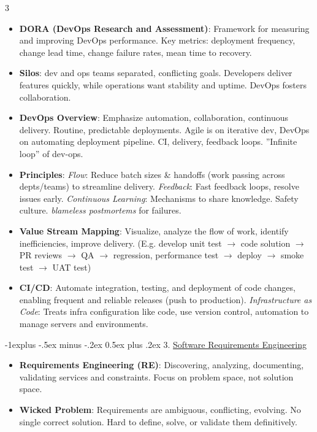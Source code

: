 \documentclass[a4paper, 10pt, landscape]{article}
\makeatletter
\renewcommand{\subsection}{\@startsection{subsection}{2}{0mm}%
                                {-1explus -.5ex minus -.2ex}%
                                {0.5ex plus .2ex}%
                                {\normalfont\normalsize\bfseries}}
\makeatother
\begin{document}
\begin{multicols*}{3}
\begin{itemize}
    \item \textbf{DORA (DevOps Research and Assessment)}: Framework for measuring and improving DevOps performance. Key metrics: deployment frequency, change lead time, change failure rates, mean time to recovery.
    \item \textbf{Silos}: dev and ops teams separated, conflicting goals. Developers deliver features quickly, while operations want stability and uptime. DevOps fosters collaboration.
    \item \textbf{DevOps Overview}: Emphasize automation, collaboration, continuous delivery. Routine, predictable deployments. Agile is on iterative dev, DevOps on automating deployment pipeline. CI, delivery, feedback loops. ''Infinite loop'' of dev-ops.
    \item \textbf{Principles}: \textit{Flow}: Reduce batch sizes \& handoffs (work passing across depts/teams) to streamline delivery. \textit{Feedback}: Fast feedback loops, resolve issues early. \textit{Continuous Learning}: Mechanisms to share knowledge. Safety culture. \textit{blameless postmortems} for failures.
       \item \textbf{Value Stream Mapping}: Visualize, analyze the flow of work, identify inefficiencies, improve delivery. (E.g. develop unit test $\rightarrow$ code solution $\rightarrow$ PR reviews $\rightarrow$ QA $\rightarrow$ regression, performance test $\rightarrow$ deploy $\rightarrow$ smoke test $\rightarrow$ UAT test)
    \item \textbf{CI/CD}: Automate integration, testing, and deployment of code changes, enabling frequent and reliable releases (push to production). \textit{Infrastructure as Code}: Treats infra configuration like code, use version control, automation to manage servers and environments.
\end{itemize}

\subsection{3. \underline{Software Requirements Engineering}}
\begin{itemize}
    \item \textbf{Requirements Engineering (RE)}: Discovering, analyzing, documenting, validating services and constraints. Focus on problem space, not solution space.
    \item \textbf{Wicked Problem}: Requirements are ambiguous, conflicting, evolving. No single correct solution. Hard to define, solve, or validate them definitively.
\end{itemize}	


\end{multicols*}
\end{document}

